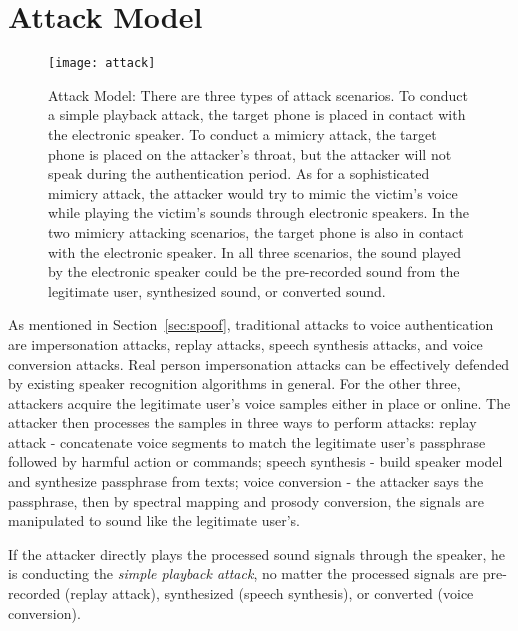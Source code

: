 \section{Attack Model}
\label{sec:attack}
\begin{figure*}[h]
	\centering
	\texttt{[image: attack]}
	\caption[MoVo Attack Model]{Attack Model: There are three types of attack scenarios. To conduct a simple playback attack, the target phone is placed in contact with the electronic speaker. To conduct a mimicry attack, the target phone is placed on the attacker's throat, but the attacker will not speak during the authentication period. As for a sophisticated mimicry attack, the attacker would try to mimic the victim's voice while playing the victim's sounds through electronic speakers. In the two mimicry attacking scenarios, the target phone is also in contact with the electronic speaker. In all three scenarios, the sound played by the electronic speaker could be the pre-recorded sound from the legitimate user, synthesized sound, or converted sound.}
	\label{fig:attack}
\end{figure*}


As mentioned in Section~\ref{sec:spoof}, traditional attacks to voice authentication are impersonation attacks, replay attacks, speech synthesis attacks, and voice conversion attacks. 
%
Real person impersonation attacks can be effectively defended by existing speaker recognition algorithms in general. For the other three, attackers acquire the legitimate user's voice samples either in place or online. The attacker then processes the samples in three ways to perform attacks: replay attack - concatenate voice segments to match the legitimate user's passphrase followed by harmful action or commands; speech synthesis - build speaker model and synthesize passphrase from texts; voice conversion - the attacker says the passphrase, then by spectral mapping and prosody conversion, the signals are manipulated to sound like the legitimate user's. 

If the attacker directly plays the processed sound signals through the speaker, he is conducting the \textit{simple playback attack}, no matter the processed signals are pre-recorded (replay attack), synthesized (speech synthesis), or converted (voice conversion).

